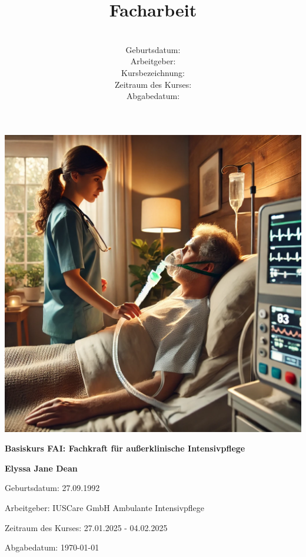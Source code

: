 \documentclass[a4paper,12pt]{article}
\title{\textbf{Facharbeit}}
\author{
    \autor \\
    Geburtsdatum: \geburtsdatum \\
    Arbeitgeber: \arbeitgeber \\
    Kursbezeichnung: \kursbezeichnung \\
    Zeitraum des Kurses: \kurszeitraum \\
    Abgabedatum: \abgabedatum
}
\date{}
\newcommand{\autor}{Elyssa Jane Dean}
\newcommand{\geburtsdatum}{27.09.1992}
\newcommand{\arbeitgeber}{IUSCare GmbH Ambulante Intensivpflege}
\newcommand{\kursbezeichnung}{Basiskurs FAI: Fachkraft für außerklinische Intensivpflege}
\newcommand{\kurszeitraum}{27.01.2025 - 04.02.2025}
\newcommand{\abgabedatum}{\today}
\begin{document}
\begin{titlepage}
	\centering
	\includegraphics[width=\textwidth]{banner}
	\vspace{0.5cm}
	{\large \textbf{\kursbezeichnung} \par}
	\vspace{0.5cm}
	{\large \textbf{\autor} \par}
	\vspace{0.5cm}
	{\large Geburtsdatum: \geburtsdatum \par}
	\vspace{0.5cm}
	{\large Arbeitgeber: \arbeitgeber \par}
	\vspace{0.5cm}
	{\large Zeitraum des Kurses: \kurszeitraum \par}
	\vspace{0.5cm}
	{\large Abgabedatum: \abgabedatum \par}
\end{titlepage}

\tableofcontents
\newpage
\end{document}
